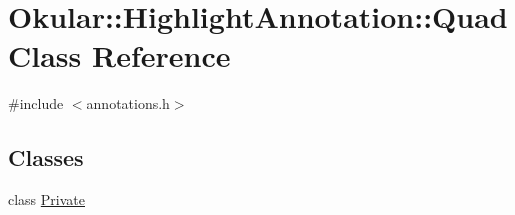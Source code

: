 \hypertarget{classOkular_1_1HighlightAnnotation_1_1Quad}{\section{Okular\+:\+:Highlight\+Annotation\+:\+:Quad Class Reference}
\label{classOkular_1_1HighlightAnnotation_1_1Quad}
}


{\ttfamily \#include $<$annotations.\+h$>$}

\subsection*{Classes}
\begin{DoxyCompactItemize}
\item 
class \hyperlink{classHighlightAnnotation_1_1Quad_1_1Private}{Private}
\end{DoxyCompactItemize}
